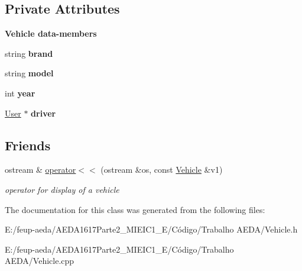 \subsection*{Private Attributes}
\begin{Indent}\textbf{ Vehicle data-\/members}\par
\begin{DoxyCompactItemize}
\item 
string {\bfseries brand}
\item 
string {\bfseries model}
\item 
int {\bfseries year}
\item 
\hyperlink{class_user}{User} $\ast$ {\bfseries driver}
\end{DoxyCompactItemize}
\end{Indent}
\subsection*{Friends}
\begin{DoxyCompactItemize}
\item 
ostream \& \hyperlink{group___vehicle_ga854e861646772cea9bb6222c5b03b1d4}{operator$<$$<$} (ostream \&os, const \hyperlink{class_vehicle}{Vehicle} \&v1)
\begin{DoxyCompactList}\small\item\em operator for display of a vehicle \end{DoxyCompactList}\end{DoxyCompactItemize}


The documentation for this class was generated from the following files\+:\begin{DoxyCompactItemize}
\item 
E\+:/feup-\/aeda/\+A\+E\+D\+A1617\+Parte2\+\_\+M\+I\+E\+I\+C1\+\_\+\+E/\+Código/\+Trabalho A\+E\+D\+A/Vehicle.\+h\item 
E\+:/feup-\/aeda/\+A\+E\+D\+A1617\+Parte2\+\_\+M\+I\+E\+I\+C1\+\_\+\+E/\+Código/\+Trabalho A\+E\+D\+A/Vehicle.\+cpp\end{DoxyCompactItemize}
